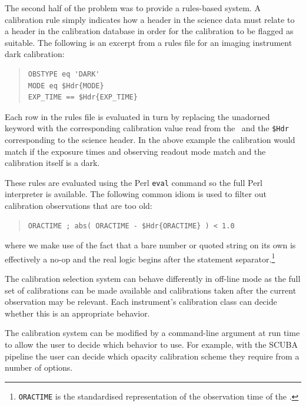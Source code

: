 \documentclass[final,authoryear,5p,times,twocolumn]{elsarticle}
\begin{document}
The second half of the problem was to provide a rules-based system.
A calibration rule simply indicates how a header in the science data
must relate to a header in the calibration database in order for the
calibration to be flagged as suitable. The following is an excerpt
from a rules file for an imaging instrument dark calibration:

\begin{quote}
{\small
\begin{verbatim}
OBSTYPE eq 'DARK'
MODE eq $Hdr{MODE}
EXP_TIME == $Hdr{EXP_TIME}
\end{verbatim}
}
\end{quote}

Each row in the rules file is evaluated in turn by replacing the
unadorned keyword with the corresponding calibration value read from
the \Index\ and the \texttt{\$Hdr} corresponding to the science
header. In the above example the
calibration would match if the exposure times and observing readout
mode match and the calibration itself is a dark.

These rules are evaluated using the Perl \texttt{eval} command
so the full Perl interpreter is available. The following common idiom
is used to filter out calibration observations that are too old:

\begin{quote}
{\small
\begin{verbatim}
ORACTIME ; abs( ORACTIME - $Hdr{ORACTIME} ) < 1.0
\end{verbatim}
}
\end{quote}

where we make use of the fact that a bare number or quoted string on
its own is effectively a no-op and the real logic begins after the
statement separator.\footnote{\texttt{ORACTIME} is the standardised
representation of the observation time of the \Frame.}

The calibration selection system can behave differently in off-line
mode as the full set of calibrations can be made available and
calibrations taken after the current observation may be relevant. Each
instrument's calibration class can decide whether this is an
appropriate behavior.

The calibration system can be modified by a command-line argument at
run time to allow the user to decide which behavior to use. For
example, with the SCUBA pipeline \citep{1999ASPC..172..171J} the user
can decide which opacity calibration scheme they require from a number
of options.
\end{document}
